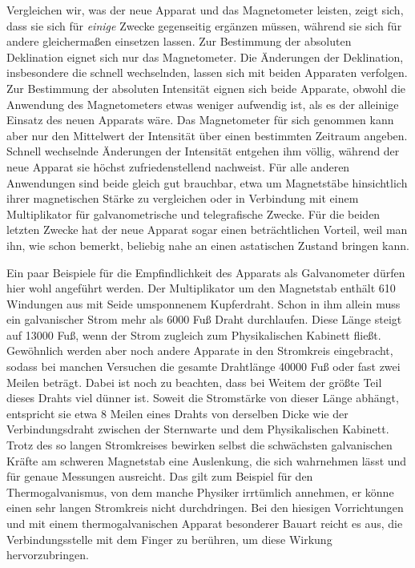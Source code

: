 Vergleichen wir, was der neue Apparat und das Magnetometer leisten, zeigt sich, dass sie sich für \textit{einige} Zwecke gegenseitig ergänzen müssen, während sie sich für andere gleichermaßen einsetzen lassen. Zur Bestimmung der absoluten Deklination eignet sich nur das Magnetometer. Die Änderungen der Deklination, insbesondere die schnell wechselnden, lassen sich mit beiden Apparaten verfolgen. Zur Bestimmung der absoluten Intensität eignen sich beide Apparate, obwohl die Anwendung des Magnetometers etwas weniger aufwendig ist, als es der alleinige Einsatz des neuen Apparats wäre. Das Magnetometer für sich genommen kann aber nur den Mittelwert der Intensität über einen bestimmten Zeitraum angeben. Schnell wechselnde Änderungen der Intensität entgehen ihm völlig, während der neue Apparat sie höchst zufriedenstellend nachweist. Für alle anderen Anwendungen sind beide gleich gut brauchbar, etwa um Magnetstäbe hinsichtlich ihrer magnetischen Stärke zu vergleichen oder in Verbindung mit einem Multiplikator für galvanometrische und telegrafische Zwecke. Für die beiden letzten Zwecke hat der neue Apparat sogar einen beträchtlichen Vorteil, weil man ihn, wie schon bemerkt, beliebig nahe an einen astatischen Zustand bringen kann.

Ein paar Beispiele für die Empfindlichkeit des Apparats als Galvanometer dürfen hier wohl angeführt werden. Der Multiplikator um den Magnetstab enthält 610 Windungen aus mit Seide umsponnenem Kupferdraht. Schon in ihm allein muss ein galvanischer Strom mehr als 6000 Fuß Draht durchlaufen. Diese Länge steigt auf 13000 Fuß, wenn der Strom zugleich zum Physikalischen Kabinett fließt. Gewöhnlich werden aber noch andere Apparate in den Stromkreis eingebracht, sodass bei manchen Versuchen die gesamte Drahtlänge 40000 Fuß oder fast zwei Meilen beträgt. Dabei ist noch zu beachten, dass bei Weitem der größte Teil dieses Drahts viel dünner ist. Soweit die Stromstärke von dieser Länge abhängt, entspricht sie etwa 8 Meilen eines Drahts von derselben Dicke wie der Verbindungsdraht zwischen der Sternwarte und dem Physikalischen Kabinett. Trotz des so langen Stromkreises bewirken selbst die schwächsten galvanischen Kräfte am schweren Magnetstab eine Auslenkung, die sich wahrnehmen lässt und für genaue Messungen ausreicht. Das gilt zum Beispiel für den Thermogalvanismus, von dem manche Physiker irrtümlich annehmen, er könne einen sehr langen Stromkreis nicht durchdringen. Bei den hiesigen Vorrichtungen und mit einem thermogalvanischen Apparat besonderer Bauart reicht es aus, die Verbindungsstelle mit dem Finger zu berühren, um diese Wirkung hervorzubringen.

